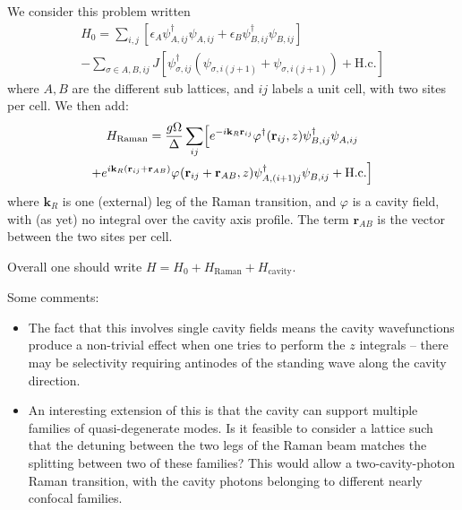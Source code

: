 \documentclass[twocolumn]{revtex4-1}
\renewcommand{\vec}[1]{\mathbf{#1}}
\begin{document}
We consider this problem written 
\begin{multline}
  \label{eq:20}
  H_0=\sum_{i,j} \left[
    \epsilon_A \psi^\dagger_{A,ij} \psi^{}_{A,ij}
    +
    \epsilon_B \psi^\dagger_{B,ij} \psi^{}_{B,ij}
  \right]
  \\  
  - \!\!\!\! \sum_{\sigma \in A,B,ij} \!\!
  J \left[
    \psi^\dagger_{\sigma,ij} 
    \left(\psi^{}_{\sigma,i(j+1)} + \psi^{}_{\sigma,i(j+1)}\right)
    +
    \text{H.c.}
  \right]
\end{multline}
where $A,B$ are the different sub lattices, and $ij$ labels
a unit cell, with two sites per cell. We then add:
\begin{multline}
  \label{eq:21}
  H_{\text{Raman}} =
  \frac{g\Omega}{\Delta}
  \sum_{ij} \Bigl[
    e^{-i\vec{k}_R \vec{r}_{ij}} \varphi^\dagger(\vec{r}_{ij},z) 
    \psi^\dagger_{B,ij} \psi^{}_{A,ij} 
    \\+
    e^{i\vec{k}_R (\vec{r}_{ij} + \vec{r}_{AB})} \varphi^{}(\vec{r}_{ij}+\vec{r}_{AB},z) 
    \psi^\dagger_{A,(i+1)j} \psi^{}_{B,ij} 
    + \text{H.c.}
  \Bigr]
\end{multline}
where $\vec{k}_R$ is one (external) leg of the Raman transition, and
$\varphi$ is a cavity field, with (as yet) no integral over the cavity
axis profile.  The term $\vec{r}_{AB}$ is the vector between the two
sites per cell.

Overall one should write $H=H_0 + H_{\text{Raman}} +H_{\text{cavity}}$.

Some comments:
\begin{itemize}
\item The fact that this involves single cavity fields means the
  cavity wavefunctions produce a non-trivial effect when one tries to
  perform the $z$ integrals -- there may be selectivity requiring
  antinodes of the standing wave along the cavity direction.
\item An interesting extension of this is that the cavity can support
  multiple families of quasi-degenerate modes.  Is it feasible to
  consider a lattice such that the detuning between the two legs of
  the Raman beam matches the splitting between two of these families?
  This would allow a two-cavity-photon Raman transition, with the
  cavity photons belonging to different nearly confocal
  families.
\end{itemize}
\end{document}
